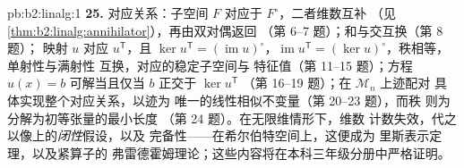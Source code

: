 \begin{solution}{pb:b2:linalg:1}
\textbf{25.} 对应关系：子空间 $F$ 对应于
$F^\circ$，二者维数互补
（见\cref{thm:b2:linalg:annihilator}），再由双对偶返回
（第 6--7 题）；和与交互换（第 8 题）；
映射 $u$ 对应 $u^{\mathsf T}$，且 $\ker u^{\mathsf T}
= (\operatorname{im}u)^\circ$，$\operatorname{im}u^{\mathsf T} =
(\ker u)^\circ$，秩相等，单射性与满射性
互换，对应的稳定子空间与
特征值（第 11--15 题）；方程 $u(x) = b$
可解当且仅当 $b$ 正交于 $\ker u^{\mathsf T}$
（第 16--19 题）；在 $\mathcal{M}_n$ 上迹配对
具体实现整个对应关系，以迹为
唯一的线性相似不变量（第 20--23 题），而秩
则为分解为初等张量的最小长度
（第 24 题）。在无限维情形下，维数
计数失效，代之以像上的\emph{闭性}假设，以及
完备性——在希尔伯特空间上，这便成为
里斯表示定理，以及紧算子的
弗雷德霍姆理论；这些内容将在本科三年级分册中严格证明。
\end{solution}

